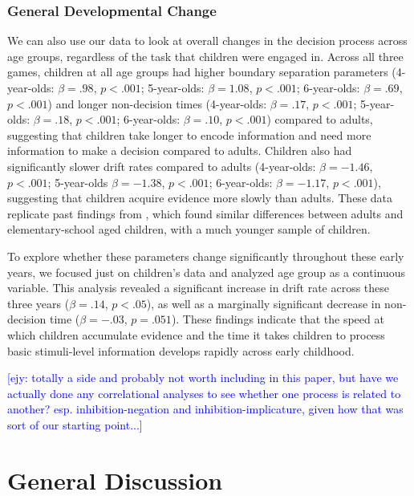 \documentclass[10pt,letterpaper]{article}
\newcommand{\ejy}[1]{\textcolor{Blue}{[ejy: #1]}}  %
\begin{document}
\subsubsection{General Developmental Change}
We can also use our data to look at overall changes in the decision process across age groups, regardless of the task that children were engaged in. Across all three games, children at all age groups had higher boundary separation parameters (4-year-olds: $\beta = .98$, $p <.001$; 5-year-olds: $\beta = 1.08$, $p <.001$; 6-year-olds: $\beta = .69$, $p <.001$) and longer non-decision times (4-year-olds: $\beta = .17$, $p <.001$; 5-year-olds: $\beta = .18$, $p <.001$; 6-year-olds: $\beta = .10$, $p <.001$) compared to adults, suggesting that children take longer to encode information and need more information to make a decision compared to adults.  Children also had significantly slower drift rates compared to adults (4-year-olds: $\beta = -1.46$, $p <.001$; 5-year-olds $\beta = -1.38$, $p <.001$; 6-year-olds: $\beta = -1.17$, $p <.001$), suggesting that children acquire evidence more slowly than adults.  These data replicate past findings from , which found similar differences between adults and elementary-school aged children, with a much younger sample of children.  

To explore whether these parameters change significantly throughout these early years, we focused just on children's data and analyzed age group as a continuous variable.  This analysis revealed a significant increase in drift rate across these three years ($\beta = .14$, $p < .05$), as well as a marginally significant decrease in non-decision time ($\beta = -.03$, $p = .051$).  These findings indicate that the speed at which children accumulate evidence and the time it takes children to process basic stimuli-level information develops rapidly across early childhood.  

\ejy{totally a side and probably not worth including in this paper, but have we actually done any correlational analyses to see whether one process is related to another? esp. inhibition-negation and inhibition-implicature, given how that was sort of our starting point...}


\section{General Discussion}

%



\setlength{\bibleftmargin}{.125in}
\setlength{\bibindent}{-\bibleftmargin}


\end{document}

